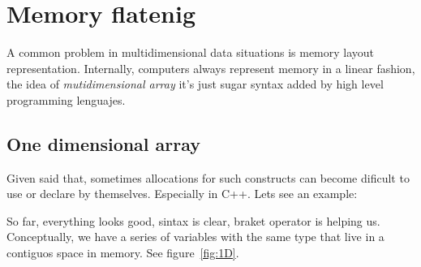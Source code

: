 \section{Memory flatenig}

A common problem in multidimensional data situations is memory layout representation. Internally, computers always represent memory in a linear fashion, the idea of \emph{mutidimensional array} it's just sugar syntax added by high level programming lenguajes.

\subsection{One dimensional array}

Given said that, sometimes allocations for such constructs can become dificult to use or declare by themselves. Especially in C++. Lets see an example:

{\centering
\begin{minipage}{\linewidth}
\end{minipage}
\par
}
\vspace{0.5cm}
So far, everything looks good, sintax is clear, braket operator is helping us.
Conceptually, we have a series of variables with the same type that live in a contiguos space in memory. See figure~\ref{fig:1D}.

